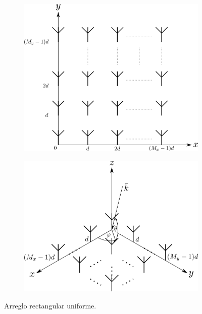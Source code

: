\begin{figure}[ht!]
    \centering
    \begin{subfigure}[b]{0.6\textwidth}
        \centering
        \includegraphics[width=\linewidth]{images/02-Beamforming/ura.png}
    \end{subfigure}
    \hfill
    \begin{subfigure}[b]{0.7\textwidth}
        \centering
        \includegraphics[width=\linewidth]{images/02-Beamforming/ura_3d.png}
    \end{subfigure}
    \caption{Arreglo rectangular uniforme.}
    \label{fig:beamforming_ura}
\end{figure}

